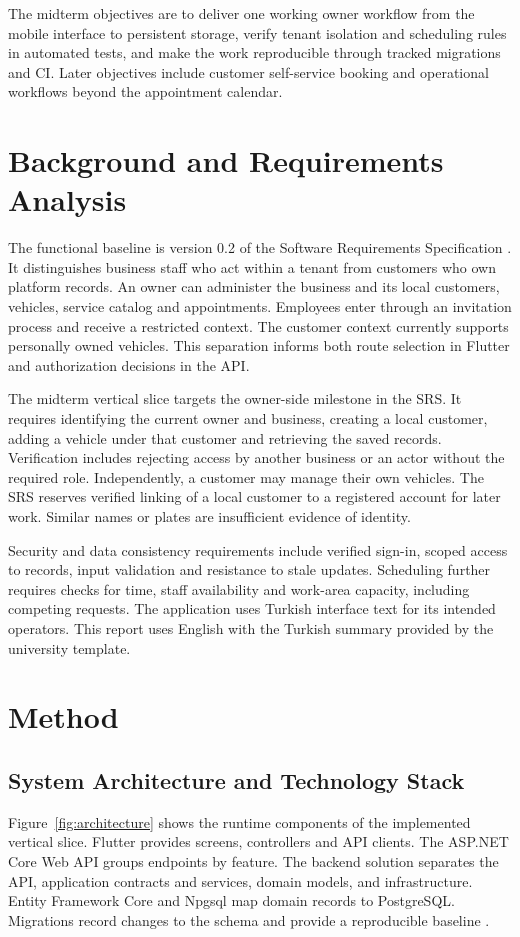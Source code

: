 \documentclass[12pt]{report}
\begin{document}
The midterm objectives are to deliver one working owner workflow from the mobile interface to persistent storage, verify tenant isolation and scheduling rules in automated tests, and make the work reproducible through tracked migrations and CI. Later objectives include customer self-service booking and operational workflows beyond the appointment calendar.

\chapter{Background and Requirements Analysis}
The functional baseline is version 0.2 of the Software Requirements Specification \cite{srs}. It distinguishes business staff who act within a tenant from customers who own platform records. An owner can administer the business and its local customers, vehicles, service catalog and appointments. Employees enter through an invitation process and receive a restricted context. The customer context currently supports personally owned vehicles. This separation informs both route selection in Flutter and authorization decisions in the API.

The midterm vertical slice targets the owner-side milestone in the SRS. It requires identifying the current owner and business, creating a local customer, adding a vehicle under that customer and retrieving the saved records. Verification includes rejecting access by another business or an actor without the required role. Independently, a customer may manage their own vehicles. The SRS reserves verified linking of a local customer to a registered account for later work. Similar names or plates are insufficient evidence of identity.

Security and data consistency requirements include verified sign-in, scoped access to records, input validation and resistance to stale updates. Scheduling further requires checks for time, staff availability and work-area capacity, including competing requests. The application uses Turkish interface text for its intended operators. This report uses English with the Turkish summary provided by the university template.

\chapter{Method}
\section{System Architecture and Technology Stack}
Figure~\ref{fig:architecture} shows the runtime components of the implemented vertical slice. Flutter provides screens, controllers and API clients. The ASP.NET Core Web API groups endpoints by feature. The backend solution separates the API, application contracts and services, domain models, and infrastructure. Entity Framework Core and Npgsql map domain records to PostgreSQL. Migrations record changes to the schema and provide a reproducible baseline \cite{repo,efmigrations}.
\end{document}
